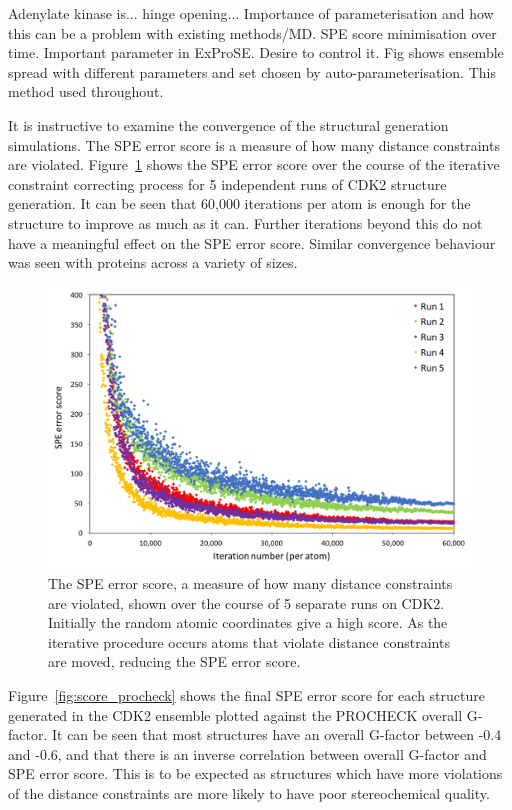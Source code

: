 Adenylate kinase is... hinge opening...
Importance of parameterisation and how this can be a problem with existing methods/MD.
SPE score minimisation over time.
Important parameter in ExProSE.
Desire to control it.
Fig shows ensemble spread with different parameters and set chosen by auto-parameterisation.
This method used throughout.

It is instructive to examine the convergence of the structural generation simulations.
The SPE error score is a measure of how many distance constraints are violated.
Figure~\ref{fig:spe_convergence} shows the SPE error score over the course of the iterative constraint correcting process for 5 independent runs of CDK2 structure generation.
It can be seen that 60,000 iterations per atom is enough for the structure to improve as much as it can.
Further iterations beyond this do not have a meaningful effect on the SPE error score.
Similar convergence behaviour was seen with proteins across a variety of sizes.


\begin{figure}
\centering

\includegraphics[width=\textwidth]{figures/spe_convergence/spe_convergence}

\caption{The SPE error score, a measure of how many distance constraints are violated, shown over the course of 5 separate runs on CDK2.
Initially the random atomic coordinates give a high score.
As the iterative procedure occurs atoms that violate distance constraints are moved, reducing the SPE error score.}

\label{fig:spe_convergence}
\end{figure}


Figure~\ref{fig:score_procheck} shows the final SPE error score for each structure generated in the CDK2 ensemble plotted against the PROCHECK overall G-factor.
It can be seen that most structures have an overall G-factor between -0.4 and -0.6, and that there is an inverse correlation between overall G-factor and SPE error score.
This is to be expected as structures which have more violations of the distance constraints are more likely to have poor stereochemical quality.


